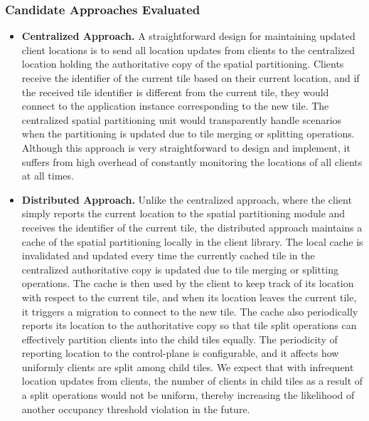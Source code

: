 \subsubsection{Candidate Approaches Evaluated}
\begin{itemize}
\item \textbf{Centralized Approach. }A straightforward design for maintaining updated client locations is to send all location updates from clients to the centralized location holding the authoritative copy of the spatial partitioning. Clients receive the identifier of the current tile based on their current location, and if the received tile identifier is different from the current tile, they would connect to the application instance corresponding to the new tile. The centralized spatial partitioning unit would transparently handle scenarios when the partitioning is updated due to tile merging or splitting operations. Although this approach is very straightforward to design and implement, it suffers from high overhead of constantly monitoring the locations of all clients at all times.
\item \textbf{Distributed Approach. } Unlike the centralized approach, where the client simply reports the current location to the spatial partitioning module and receives the identifier of the current tile, the distributed approach maintains a cache of the spatial partitioning locally in the client library. The local cache is invalidated and updated every time the currently cached tile in the centralized authoritative copy is updated due to tile merging or splitting operations. The cache is then used by the client to keep track of its location with respect to the current tile, and when its location leaves the current tile, it triggers a migration to connect to the new tile. The cache also periodically reports its location to the authoritative copy so that tile split operations can effectively partition clients into the child tiles equally. The periodicity of reporting location to the control-plane is configurable, and it affects how uniformly clients are split among child tiles. We expect that with infrequent location updates from clients, the number of clients in child tiles as a result of a split operations would not be uniform, thereby increasing the likelihood of another occupancy threshold violation in the future.
\end{itemize}

